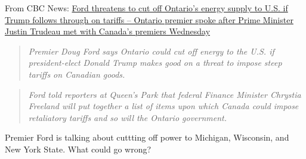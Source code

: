 From CBC News:
\href{https://www.cbc.ca/news/canada/toronto/doug-ford-ontario-premiers-meet-justin-trudeau-1.7407948}{Ford
threatens to cut off Ontario's energy supply to U.S. if Trump follows
through on tariffs -- Ontario premier spoke after Prime Minister Justin
Trudeau met with Canada's premiers Wednesday}

\begin{quote}
\emph{Premier Doug Ford says Ontario could cut off energy to the U.S. if
president-elect Donald Trump makes good on a threat to impose steep
tariffs on Canadian goods.}
\end{quote}

\begin{quote}
\emph{Ford told reporters at Queen's Park that federal Finance Minister
Chrystia Freeland will put together a list of items upon which Canada
could impose retaliatory tariffs and so will the Ontario government.}
\end{quote}

Premier Ford is talking about cuttting off power to Michigan, Wisconsin,
and New York State. What could go wrong?
